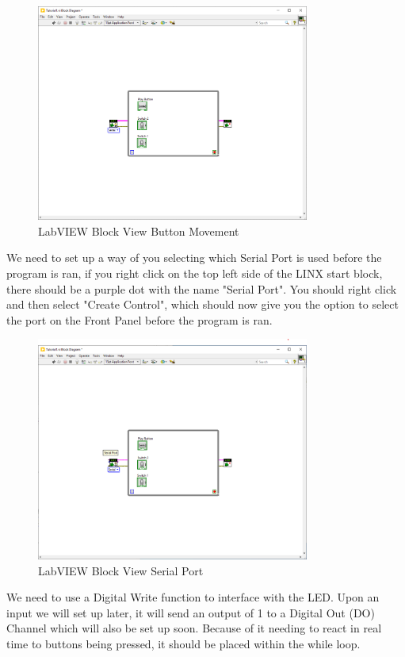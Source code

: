 \documentclass[a4paper,11pt]{report}
\begin{document}
\begin{figure}[H]
\centering
\includegraphics[width=0.8\textwidth]{screenshots/labview16}
\caption{LabVIEW Block View Button Movement}
\end{figure}

We need to set up a way of you selecting which Serial Port is used before the program is ran, if you right click on the top left side of the LINX start block, there should be a purple dot with the name "Serial Port". You should right click and then select "Create Control", which should now give you the option to select the port on the Front Panel before the program is ran.

\begin{figure}[H]
\centering
\includegraphics[width=0.8\textwidth]{screenshots/labview18}
\caption{LabVIEW Block View Serial Port}
\end{figure}

We need to use a Digital Write function to interface with the LED. Upon an input we will set up later, it will send an output of 1 to a Digital Out (DO) Channel which will also be set up soon. Because of it needing to react in real time to buttons being pressed, it should be placed within the while loop.
\end{document}
